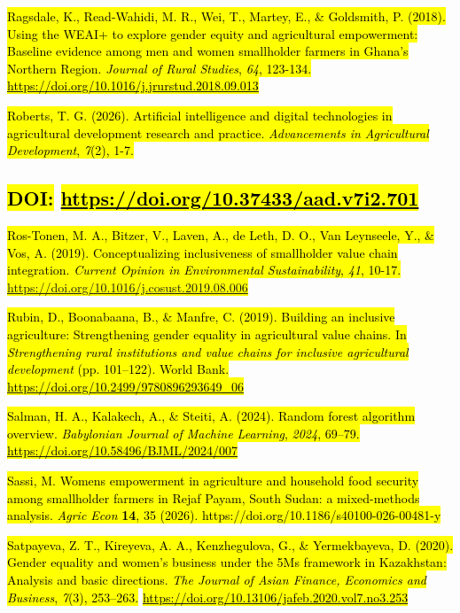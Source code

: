 \hl{Ragsdale, K., Read-Wahidi, M. R., Wei, T., Martey, E., \& Goldsmith,
P. (2018). Using the WEAI+ to explore gender equity and agricultural
empowerment: Baseline evidence among men and women smallholder farmers
in Ghana's Northern Region. \emph{Journal of Rural Studies}, \emph{64},
123-134.}
\href{https://doi.org/10.1016/j.jrurstud.2018.09.013}{\hl{https://doi.org/10.1016/j.jrurstud.2018.09.013}}

\hl{Roberts, T. G. (2026). Artificial intelligence and digital
technologies in agricultural development research and practice.
\emph{Advancements in Agricultural Development}, \emph{7}(2), 1-7.}

\subsection{\texorpdfstring{\hl{DOI:}
\href{https://doi.org/10.37433/aad.v7i2.701}{\hl{https://doi.org/10.37433/aad.v7i2.701}}}{DOI: https://doi.org/10.37433/aad.v7i2.701}}\label{doi-httpsdoi.org10.37433aad.v7i2.701}

\hl{Ros-Tonen, M. A., Bitzer, V., Laven, A., de Leth, D. O., Van
Leynseele, Y., \& Vos, A. (2019). Conceptualizing inclusiveness of
smallholder value chain integration. \emph{Current Opinion in
Environmental Sustainability}, \emph{41}, 10-17.
\mbox{\url{https://doi.org/10.1016/j.cosust.2019.08.006}}}

\hl{Rubin, D., Boonabaana, B., \& Manfre, C. (2019). Building an
inclusive agriculture: Strengthening gender equality in agricultural
value chains. In \emph{Strengthening rural institutions and value chains
for inclusive agricultural development} (pp. 101--122). World Bank.}
\href{https://doi.org/10.2499/9780896293649_06}{\hl{https://doi.org/10.2499/9780896293649\_06}}

\hl{Salman, H. A., Kalakech, A., \& Steiti, A. (2024). Random forest
algorithm overview. \emph{Babylonian Journal of Machine Learning},
\emph{2024}, 69--79.}
\href{https://doi.org/10.58496/BJML/2024/007.}{\hl{https://doi.org/10.58496/BJML/2024/007}}

\hl{Sassi, M. Women\textquotesingle s empowerment in agriculture and
household food security among smallholder farmers in Rejaf Payam, South
Sudan: a mixed-methods analysis. \emph{Agric Econ} \textbf{14}, 35
(2026). https://doi.org/10.1186/s40100-026-00481-y}

\hl{Satpayeva, Z. T., Kireyeva, A. A., Kenzhegulova, G., \&
Yermekbayeva, D. (2020). Gender equality and women's business under the
5Ms framework in Kazakhstan: Analysis and basic directions. \emph{The
Journal of Asian Finance, Economics and Business}, \emph{7}(3),
253--263.}
\href{https://doi.org/10.13106/jafeb.2020.vol7.no3.253}{\hl{https://doi.org/10.13106/jafeb.2020.vol7.no3.253}}

